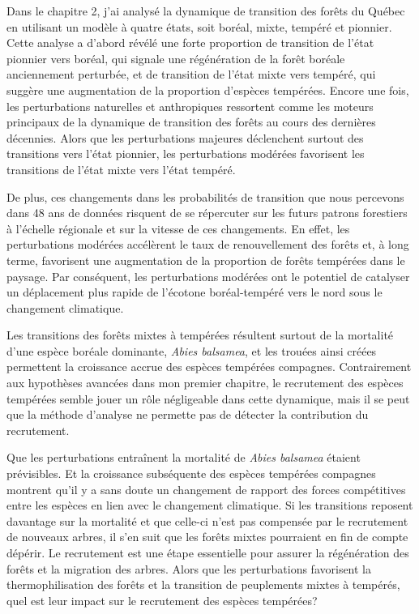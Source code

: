 Dans le chapitre 2, j'ai analysé la dynamique de transition des forêts
du Québec en utilisant un modèle à quatre états, soit boréal, mixte,
tempéré et pionnier. Cette analyse a d'abord révélé une forte proportion
de transition de l'état pionnier vers boréal, qui signale une
régénération de la forêt boréale anciennement perturbée, et de
transition de l'état mixte vers tempéré, qui suggère une augmentation de
la proportion d'espèces tempérées. Encore une fois, les perturbations
naturelles et anthropiques ressortent comme les moteurs principaux de la
dynamique de transition des forêts au cours des dernières décennies.
Alors que les perturbations majeures déclenchent surtout des transitions
vers l'état pionnier, les perturbations modérées favorisent les
transitions de l'état mixte vers l'état tempéré.

De plus, ces changements dans les probabilités de transition que nous
percevons dans 48 ans de données risquent de se répercuter sur les
futurs patrons forestiers à l'échelle régionale et sur la vitesse de ces
changements. En effet, les perturbations modérées accélèrent le taux de
renouvellement des forêts et, à long terme, favorisent une augmentation
de la proportion de forêts tempérées dans le paysage. Par conséquent,
les perturbations modérées ont le potentiel de catalyser un déplacement
plus rapide de l'écotone boréal-tempéré vers le nord sous le changement
climatique.

Les transitions des forêts mixtes à tempérées résultent surtout de la
mortalité d'une espèce boréale dominante, \emph{Abies balsamea}, et les
trouées ainsi créées permettent la croissance accrue des espèces
tempérées compagnes. Contrairement aux hypothèses avancées dans mon
premier chapitre, le recrutement des espèces tempérées semble jouer un
rôle négligeable dans cette dynamique, mais il se peut que la méthode
d'analyse ne permette pas de détecter la contribution du recrutement.

Que les perturbations entraînent la mortalité de \emph{Abies balsamea}
étaient prévisibles. Et la croissance subséquente des espèces tempérées
compagnes montrent qu'il y a sans doute un changement de rapport des
forces compétitives entre les espèces en lien avec le changement
climatique. Si les transitions reposent davantage sur la mortalité et
que celle-ci n'est pas compensée par le recrutement de nouveaux arbres,
il s'en suit que les forêts mixtes pourraient en fin de compte dépérir.
Le recrutement est une étape essentielle pour assurer la régénération
des forêts et la migration des arbres. Alors que les perturbations
favorisent la thermophilisation des forêts et la transition de
peuplements mixtes à tempérés, quel est leur impact sur le recrutement
des espèces tempérées?

